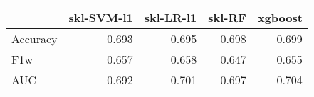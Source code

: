 \begin{tabular}{lrrrr}
\toprule
{} &  skl-SVM-l1 &  skl-LR-l1 &  skl-RF &  xgboost \\
\midrule
Accuracy &       0.693 &      0.695 &   0.698 &    0.699 \\
F1w      &       0.657 &      0.658 &   0.647 &    0.655 \\
AUC      &       0.692 &      0.701 &   0.697 &    0.704 \\
\bottomrule
\end{tabular}
